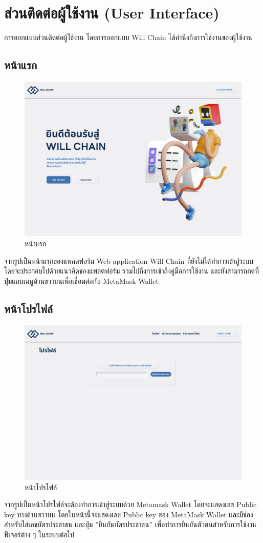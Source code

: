 \documentclass[12pt,oneside,openright,a4paper]{cpe-thai-project}
\begin{document}
\section{ส่วนติดต่อผู้ใช้งาน (User Interface)}
\tab การออกแบบส่วนติดต่อผู้ใช้งาน โดยการออกแบบ Will Chain ได้คำนึงถึงการใช้งานของผู้ใช้งาน 
\subsection{หน้าแรก}
		\begin{figure}[!thb]
			\centering
			\includegraphics[scale=0.2]{Home}
			\caption{หน้าแรก}
		\end{figure}
		\FloatBarrier
		\tab จากรูปเป็นหน้าแรกของแพลตฟอร์ม Web application Will Chain ที่ยังไม่ได้ทำการเข้าสู่ระบบ โดยจะประกอบไปด้วยแนวคิดของแพลตฟอร์ม รวมไปถึงการเข้าถึงคู่มือการใช้งาน และยังสามารถกดที่ปุ่มแถบเมนูด้านขวาบนเพื่อเชื่อมต่อกับ MetaMask Wallet
\subsection{หน้าโปรไฟล์}
		\begin{figure}[!thb]
			\centering
			\includegraphics[scale=0.2]{profile}
			\caption{หน้าโปรไฟล์}
		\end{figure}
		\FloatBarrier
		\tab จากรูปเป็นหน้าโปรไฟล์จะต้องทำการเข้าสู่ระบบด้วย Metamask Wallet โดยจะแสดงเลข Public key ทางด้านขวาบน โดยในหน้านี้จะแสดงเลข Public key ของ MetaMask Wallet และมีช่องสำหรับใส่เลขบัตรประชาชน และปุ่ม ''ยืนยันบัตรประชาชน'' เพื่อทำการยืนยันตัวตนสำหรับการใช้งานฟีเจอร์ต่าง ๆ ในระบบต่อไป
\end{document}
